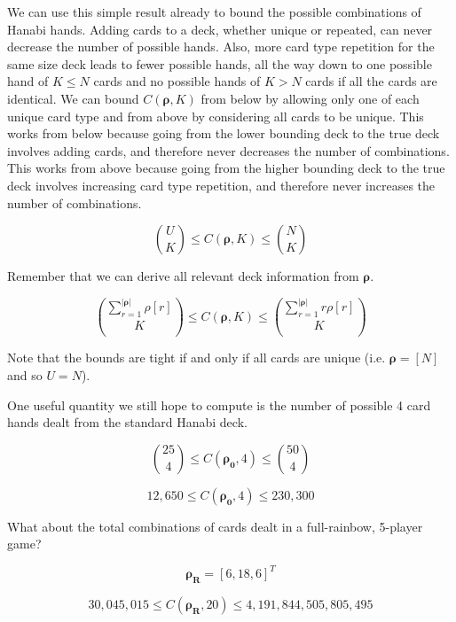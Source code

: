 \documentclass{article}
\begin{document}
We can use this simple result already to bound the possible combinations of Hanabi hands. Adding cards to a deck, whether unique or repeated, can never decrease the number of possible hands. Also, more card type repetition for the same size deck leads to fewer possible hands, all the way down to one possible hand of $K \leq N$ cards and no possible hands of $K > N$ cards if all the cards are identical.  We can bound $C(\bm{\rho}, K)$ from below by allowing only one of each unique card type and from above by considering all cards to be unique. This works from below because going from the lower bounding deck to the true deck involves adding cards, and therefore never decreases the number of combinations. This works from above because going from the higher bounding deck to the true deck involves increasing card type repetition, and therefore never increases the number of combinations.

\begin{equation}
    \binom{U}{K} \leq C(\bm{\rho}, K) \leq \binom{N}{K} 
\end{equation}

Remember that we can derive all relevant deck information from $\bm{\rho}$.

\begin{equation}
    \binom{\sum_{r=1}^{\lvert \bm{\rho}\rvert} \rho[r]}{K} \leq C(\bm{\rho}, K) \leq \binom{\sum_{r=1}^{\lvert\bm{\rho}\rvert} r \rho[r]}{K} 
\end{equation} 

Note that the bounds are tight if and only if all cards are unique (i.e. $\bm{\rho}=[N]$ and so $U=N$). 


One useful quantity we still hope to compute is the number of possible 4 card hands dealt from the standard Hanabi deck.

\begin{equation}
    \binom{25}{4} \leq C(\bm{\rho_0}, 4) \leq \binom{50}{4} 
\end{equation}

\begin{equation}
    12,650 \leq C(\bm{\rho_0}, 4) \leq 230,300 
\end{equation}

What about the total combinations of cards dealt in a full-rainbow, 5-player game?

\begin{equation}
    \bm{\rho_R} = [6, 18, 6]^T
\end{equation}

\begin{equation}
    30,045,015 \leq C(\bm{\rho_R}, 20) \leq 4,191,844,505,805,495
\end{equation}
\end{document}
